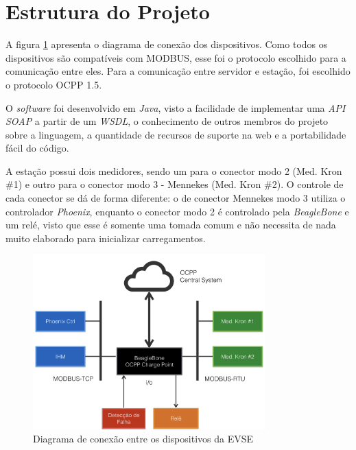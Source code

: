   \section{Estrutura do Projeto}
  \label{methodology:structure}

    A figura \ref{fig:proj-diagram} apresenta o diagrama de conexão dos dispositivos. Como todos os dispositivos são compatíveis com MODBUS, esse foi o protocolo escolhido para a comunicação entre eles. Para a comunicação entre servidor e estação, foi escolhido o protocolo \ac{OCPP} 1.5. 

    O \textit{software} foi desenvolvido em \textit{Java}, visto a facilidade de implementar uma \textit{API} \textit{\ac{SOAP}} a partir de um \textit{\ac{WSDL}}, o conhecimento de outros membros do projeto sobre a linguagem, a quantidade de recursos de suporte na web e a portabilidade fácil do código.

    A estação possui dois medidores, sendo um para o conector modo 2 (Med. Kron \#1) e outro para o conector modo 3 - Mennekes (Med. Kron \#2). O controle de cada conector se dá de forma diferente: o de conector Mennekes modo 3 utiliza o controlador \textit{Phoenix}, enquanto o conector modo 2 é controlado pela \textit{BeagleBone} e um relé, visto que esse é somente uma tomada comum e não necessita de nada muito elaborado para inicializar carregamentos.

    \begin{figure}[H]
      \begin{center}
        \includegraphics[width=0.8\textwidth,natwidth=400,natheight=288]{assets/images/devices-diagram.png}
        \caption{Diagrama de conexão entre os dispositivos da EVSE}
        \label{fig:proj-diagram}
      \end{center}
    \end{figure}

